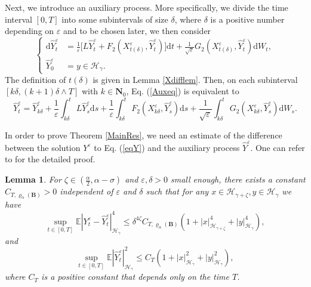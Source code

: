 \documentclass[10pt,a4paper]{article}
\newtheorem{lemma}{Lemma}[section]
\numberwithin{equation}{section}
\begin{document}
Next, we introduce an auxiliary process.
More specifically, we divide the time interval $[0, T]$ into some subintervals of size $\delta$,
where $\delta$ is a positive number depending on $\varepsilon$ and to be chosen later, we then consider
\begin{equation}\label{Auxeq}
	\left\{ \begin{aligned}
		\mathrm{d} \hat{Y}_t^\varepsilon&=\frac 1\varepsilon \big[L \hat{Y}_t^\varepsilon+F_2 (X_{t(\delta)}^\varepsilon,\hat{Y}_t^\varepsilon)\big] \mathrm{d} t+\frac 1{\sqrt{\varepsilon}} G_2(X_{t(\delta)}^\varepsilon,\hat{Y}_t^\varepsilon)\mathrm{d} W_t,\\
		\hat{Y}_0^\varepsilon&=y \in \mathcal{H}_\gamma.
	\end{aligned} \right.
\end{equation}
The definition of $t(\delta)$ is given in Lemma \ref{Xdifflem}. Then, on each subinterval $[k\delta,(k+1)\delta \wedge T]$ with $k\in\mathbf{N}_0$, Eq. (\ref{Auxeq}) is equivalent to
\begin{equation*}
	\hat{Y}_t^\varepsilon=\hat{Y}_{k\delta}^\varepsilon+\frac 1\varepsilon\int_{k\delta}^t L \hat{Y}_s^\varepsilon \mathrm{d} s+\frac 1\varepsilon\int_{k\delta}^t F_2(X_{k\delta}^\varepsilon,\hat{Y}_s^\varepsilon) \mathrm{d} s+\frac 1{\sqrt{\varepsilon}}\int_{k\delta}^tG_2(X_{k\delta}^\varepsilon,\hat{Y}_s^\varepsilon)\mathrm{d} W_s.
\end{equation*}



In order to prove Theorem \ref{MainRes}, we need an estimate of the difference between the solution $Y^\varepsilon$ to Eq. (\ref{eqY}) and the auxiliary process $\hat{Y}^\varepsilon$.
One can refer to \cite[Lemma 4.7]{LLPX25} for the detailed proof.

\begin{lemma}\label{AuxiliaryEstimate}
	For $\zeta \in (\frac \alpha2, \alpha-\sigma)$ and $\varepsilon, \delta >0$ small enough, there exists a constant $C_{T,\varrho_{\alpha}(\mathbf{B})}>0$ independent of $\varepsilon$ and $\delta$ such that for any $x \in \mathcal{H}_{\gamma+\zeta}, y \in \mathcal H_\gamma$ we have
	\begin{equation}\label{AimAuxdifference}
		\sup_{t\in [0,T]}\mathbb E | Y_t^\varepsilon-\hat{Y}_t^\varepsilon|_{\mathcal H_\gamma }^4 \leq \delta^{4 \zeta} C_{T,\varrho_{\alpha}(\mathbf{B})}  (1+|x|_{\mathcal{H}_{\gamma+\zeta} }^4+|y|_{\mathcal H_\gamma }^4 ),
	\end{equation}
	and
	\begin{equation}\label{Auxest}
		\sup_{t\in[0,T]}\mathbb E|\hat{Y}_t^\varepsilon|_{\mathcal H_\gamma }^2\leq C_T(1+| x |_{\mathcal H_\gamma }^2+|y|_{\mathcal H_\gamma }^2),
	\end{equation}
where $C_T$ is a positive constant that depends only on the time $T$.
\end{lemma}
\end{document}
